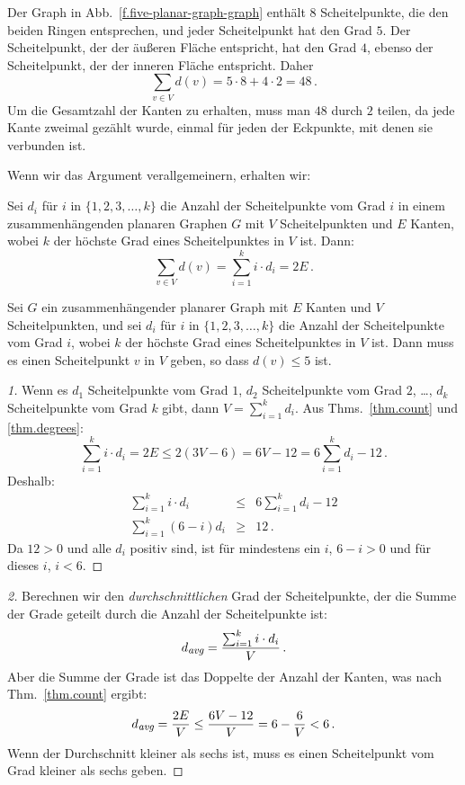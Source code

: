 \begin{example}
Der Graph in Abb.~\ref{f.five-planar-graph-graph} enthält $8$ Scheitelpunkte, die den beiden Ringen entsprechen, und jeder Scheitelpunkt hat den Grad $5$. Der Scheitelpunkt, der der äußeren Fläche entspricht, hat den Grad $4$, ebenso der Scheitelpunkt, der der inneren Fläche entspricht. Daher
\[
\sum_{v\in V} d(v) = 5\cdot 8 + 4\cdot 2=48\,.
\]
Um die Gesamtzahl der Kanten zu erhalten, muss man $48$ durch $2$ teilen, da jede Kante zweimal gezählt wurde, einmal für jeden der Eckpunkte, mit denen sie verbunden ist.
\end{example}

Wenn wir das Argument verallgemeinern, erhalten wir:
\begin{theorem}\label{thm.degrees}
Sei $d_i$ für $i$ in $\{1,2,3,\ldots,k\}$ die Anzahl der Scheitelpunkte vom Grad $i$ in einem zusammenhängenden planaren Graphen $G$ mit $V$ Scheitelpunkten und $E$ Kanten, wobei $k$ der höchste Grad eines Scheitelpunktes in $V$ ist. Dann:
\[
\sum_{v\in V} d(v) =\sum_{i=1}^{k} i\cdot d_i=2E\,.
\]
\end{theorem}

\begin{theorem}\label{thm.degree5}
Sei $G$ ein zusammenhängender planarer Graph mit $E$ Kanten und $V$ Scheitelpunkten, und sei $d_i$ für $i$ in $\{1,2,3,\ldots,k\}$ die Anzahl der Scheitelpunkte vom Grad $i$, wobei $k$ der höchste Grad eines Scheitelpunktes in $V$ ist. Dann muss es einen Scheitelpunkt $v$ in $V$ geben, so dass $d(v) \leq 5$ ist.
\end{theorem}

\begin{proof}[1]
Wenn es $d_1$ Scheitelpunkte vom Grad $1$, $d_2$ Scheitelpunkte vom Grad $2$, \ldots, $d_k$ Scheitelpunkte vom Grad $k$ gibt, dann $V=\sum_{i=1}^{k}d_i$.  Aus Thms.~\ref{thm.count} und \ref{thm.degrees}:
\[
\sum_{i=1}^{k} i\cdot d_i=2E\leq 2(3V-6) = 6V-12=6\sum_{i=1}^{k} d_i -12\,.
\]
Deshalb:
\begin{eqnarray*}
\sum_{i=1}^{k} i\cdot d_i &\leq& 6\sum_{i=1}^{k} d_i -12\\
\sum_{i=1}^{k} (6-i)d_i&\geq& 12\,.
\end{eqnarray*}
Da $12>0$ und alle $d_i$ positiv sind, ist für mindestens ein $i$, $6-i>0$ und für dieses $i$, $i<6$.
\end{proof}

\begin{proof}[2]
Berechnen wir den \emph{durchschnittlichen} Grad der Scheitelpunkte, der die Summe der Grade geteilt durch die Anzahl der Scheitelpunkte ist:
\[
d_{\textit{\footnotesize avg}}=\frac{\sum_{i=1}^{k} i\cdot d_i}{V}\,.
\]
Aber die Summe der Grade ist das Doppelte der Anzahl der Kanten, was nach Thm.~\ref{thm.count} ergibt:
\[
d_{\textit{\footnotesize avg}}=\frac{2E}{V}\leq \frac{6V-12}{V}=6-\frac{6}{V}<6\,.
\]
Wenn der Durchschnitt kleiner als sechs ist, muss es einen Scheitelpunkt vom Grad kleiner als sechs geben.
\end{proof}


